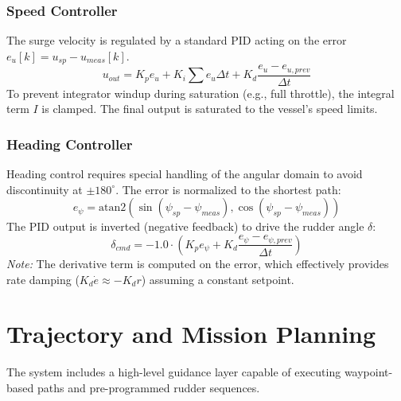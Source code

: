 \documentclass[12pt, a4paper, oneside]{report}
\begin{document}
\subsubsection{Speed Controller}
The surge velocity is regulated by a standard PID acting on the error $e_u[k] = u_{sp} - u_{meas}[k]$.
\begin{equation}
    u_{out} = K_p e_u + K_i \sum e_u \Delta t + K_d \frac{e_u - e_{u,prev}}{\Delta t}
\end{equation}
To prevent integrator windup during saturation (e.g., full throttle), the integral term $I$ is clamped. The final output is saturated to the vessel's speed limits.

\subsubsection{Heading Controller}
Heading control requires special handling of the angular domain to avoid discontinuity at $\pm 180^\circ$. The error is normalized to the shortest path:
\begin{equation}
    e_{\psi} = \text{atan2}(\sin(\psi_{sp} - \psi_{meas}), \cos(\psi_{sp} - \psi_{meas}))
\end{equation}
The PID output is inverted (negative feedback) to drive the rudder angle $\delta$:
\begin{equation}
    \delta_{cmd} = -1.0 \cdot \left( K_p e_{\psi} + K_d \frac{e_{\psi} - e_{\psi,prev}}{\Delta t} \right)
\end{equation}
\textit{Note:} The derivative term is computed on the error, which effectively provides rate damping ($K_d \dot{e} \approx -K_d r$) assuming a constant setpoint.

\section{Trajectory and Mission Planning}
The system includes a high-level guidance layer capable of executing waypoint-based paths and pre-programmed rudder sequences.
\end{document}
